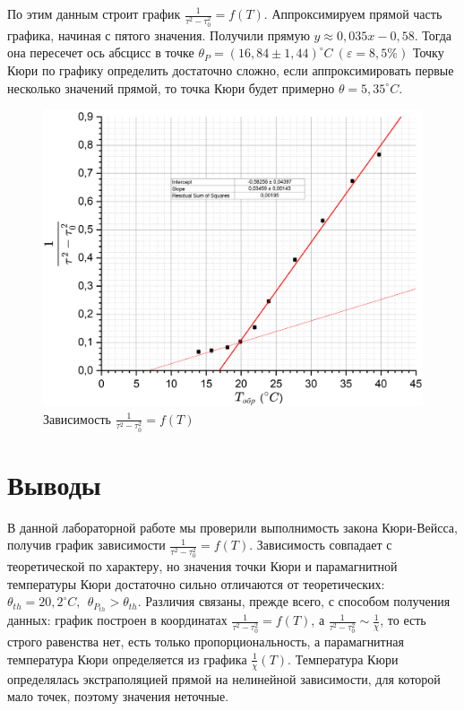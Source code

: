 \documentclass[a4paper, 12pt]{article}
\begin{document}
	По этим данным строит график $\frac{1}{\tau^2 - \tau_0^2} = f(T)$. Аппроксимируем прямой часть графика, начиная с пятого значения. Получили прямую $y \approx 0,035x - 0,58$. Тогда она пересечет ось абсцисс в точке $\theta_P = (16,84 \pm 1,44) ^{\circ}C \ (\varepsilon = 8,5\%)$
	Точку Кюри по графику определить достаточно сложно, если аппроксимировать первые несколько значений прямой, то точка Кюри будет примерно $\theta = 5,35^{\circ}C$.
	\begin{figure}[h!]
		\centering
		\includegraphics[width = \textwidth]{Veys}
		\caption{Зависимость $\frac{1}{\tau^2 - \tau_0^2} = f(T)$}
	\end{figure}
	\section*{Выводы}
	В данной лабораторной работе мы проверили выполнимость закона Кюри-Вейсса, получив график зависимости $\frac{1}{\tau^2 - \tau_0^2} = f(T)$. Зависимость совпадает с теоретической по характеру, но значения точки Кюри и парамагнитной температуры Кюри достаточно сильно отличаются от теоретических: $\theta_{th} = 20,2^{\circ}C, \ \ \theta_{P_{th}} > \theta_{th}$. Различия связаны, прежде всего, с способом получения данных: график построен в координатах $\frac{1}{\tau^2 - \tau_0^2} = f(T)$, а $\frac{1}{\tau^2 - \tau_0^2} \sim \frac{1}{\chi}$, то есть строго равенства нет, есть только пропорциональность, а парамагнитная температура Кюри определяется из графика $\frac{1}{\chi}(T)$. Температура Кюри определялась экстраполяцией прямой на нелинейной зависимости, для которой мало точек, поэтому значения неточные.
\end{document}
